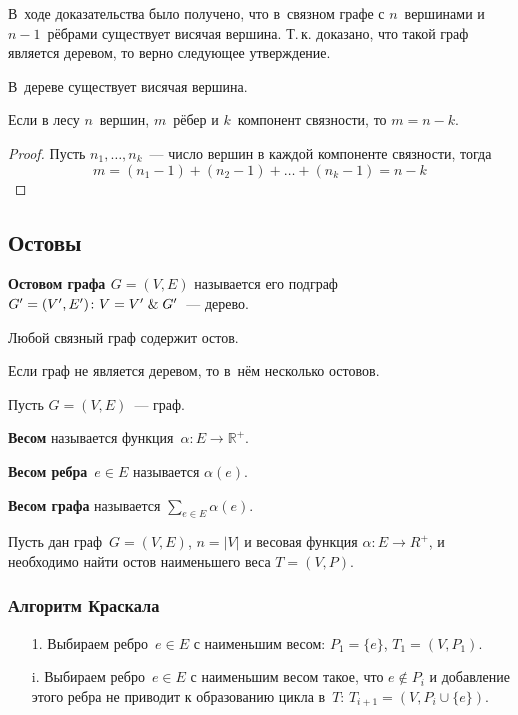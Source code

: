 В~ходе доказательства было получено, что в~связном графе с $n$~вершинами и $n - 1$~рёбрами существует висячая вершина.
Т.\,к. доказано, что такой граф является деревом, то верно следующее утверждение.
\begin{statement}
В~дереве существует висячая вершина.
\end{statement}

\begin{statement}
Если в лесу $n$~вершин, $m$~рёбер и $k$~компонент связности, то $m = n - k$.
\end{statement}
\begin{proof}
Пусть $n_1, \ldots, n_k$~--- число вершин в каждой компоненте связности, тогда
\begin{equation*}
m = (n_1 - 1) + (n_2 - 1) + \ldots + (n_k - 1) = n - k
\end{equation*}
\end{proof}

\subsection{Остовы}
 \textbf{Остовом графа $G = (V, E)$} называется его подграф~$G' = (V', E') \colon V = V' \mathrel{\&} G'$~--- дерево.

\begin{statement}
Любой связный граф содержит остов.
\end{statement}

\begin{statement}
Если граф не является деревом, то в~нём несколько остовов.
\end{statement}

Пусть $G = (V, E)$~--- граф.

 \textbf{Весом} называется функция~$\alpha \colon E \to \mathbb R^+$.

\textbf{Весом ребра}~$e \in E$ называется $\alpha(e)$.

\textbf{Весом графа} называется $\sum\limits_{e \in E} \alpha(e)$.

Пусть дан граф~$G = (V, E)$, $n = |V|$ и весовая функция $\alpha \colon E \to R^+$, и необходимо найти остов наименьшего веса $T = (V, P)$.

\subsubsection{Алгоритм Краскала}
\begin{enumerate}
	\item[1.] Выбираем ребро~$e \in E$ с наименьшим весом: $P_1 = \{ e \}$, $T_1 = (V, P_1)$.
	\item[i.] Выбираем ребро~$e \in E$ с наименьшим весом такое, что $e \notin P_i$ и добавление этого ребра не приводит к образованию цикла в~$T$: $T_{i+1} = (V, P_i \cup \{ e \})$.
\end{enumerate}

